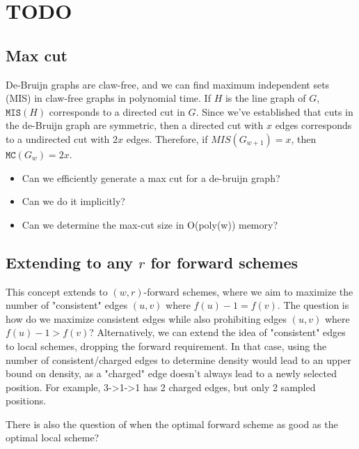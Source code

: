 \section{TODO}

\subsection{Max cut}
De-Bruijn graphs are claw-free, and we can find maximum independent sets (MIS) in claw-free graphs in polynomial time. If $H$ is the line graph of $G$, $\texttt{MIS}(H)$ corresponds to a directed cut in $G$. Since we've established that cuts in the de-Bruijn graph are symmetric, then a directed cut with $x$ edges corresponds to a undirected cut with $2x$ edges. Therefore, if $MIS(G_{w+1})=x$, then $\texttt{MC}(G_w)=2x$.



\begin{itemize}
    \item Can we efficiently generate a max cut for a de-bruijn graph? 
    \item Can we do it implicitly? 
    \item Can we determine the max-cut size in O(poly(w)) memory?
\end{itemize}

\subsection{Extending to any $r$ for forward schemes}
This concept extends to $(w, r)$-forward schemes, where we aim to maximize the number of "consistent" edges $(u, v)$ where $f(u)-1 = f(v)$. The question is how do we maximize consistent edges while also prohibiting edges $(u, v)$ where $f(u)-1 > f(v)$? Alternatively, we can extend the idea of "consistent" edges to local schemes, dropping the forward requirement. In that case, using the number of consistent/charged edges to determine density would lead to an upper bound on density, as a "charged" edge doesn't always lead to a newly selected position. For example, 3->1->1 has 2 charged edges, but only 2 sampled positions. 

There is also the question of when the optimal forward scheme as good as the optimal local scheme?